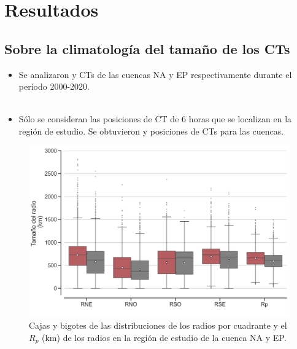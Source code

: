 \section{Resultados}

\subsection{Sobre la climatología del tamaño de los CTs}
\begin{frame}
\begin{itemize}
    \item Se analizaron {} y {} CTs de las cuencas {\red NA} y {\gray EP} respectivamente durante el período 2000-2020.
    \\~\
    \item Sólo se consideran las posiciones de CT de 6 horas que se localizan en la región de estudio. Se obtuvieron {} y {} posiciones de CTs para las cuencas.
\end{itemize}
\end{frame}

\begin{frame}
    \begin{figure}
        \centering
        \includegraphics[scale = 0.35]{Images/Figures/Fig_3_1.jpeg}
        \caption{Cajas y bigotes de las distribuciones de los radios por cuadrante y el $R_p$ (km) de los radios en la región de estudio de la cuenca {\red NA} y {\gray EP}.}
        \label{fig:fig_9}
    \end{figure}
\end{frame}

